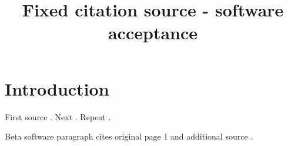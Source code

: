 \documentclass[11pt]{article}
\begin{document}
\title{Fixed citation source - software acceptance}
\maketitle
\section{Introduction}
First source \citep{evidence_6b169de2b78d452f919391b00916f2c8}. Next \citep{evidence_b5348fa59b3948ae9540b75a33ca9bd9}. Repeat \citep{evidence_6b169de2b78d452f919391b00916f2c8}.

Beta software paragraph cites original page 1 \citep{evidence_b5348fa59b3948ae9540b75a33ca9bd9} and additional source \citep{evidence_6b169de2b78d452f919391b00916f2c8}.



\end{document}
